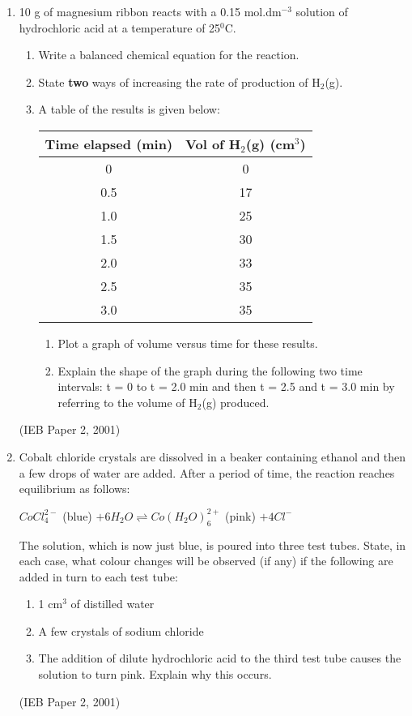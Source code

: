 {\begin{enumerate}
\item{10 g of magnesium ribbon reacts with a 0.15 mol.dm$^{-3}$ solution of hydrochloric acid at a temperature of 25$^{0}$C.
	\begin{enumerate}
	\item{Write a balanced chemical equation for the reaction.}
	\item{State \textbf{two} ways of increasing the rate of production of H$_{2}$(g).}
	\item{A table of the results is given below:}
\begin{center}
\begin{tabular}{|c|c|}\hline
\textbf{Time elapsed (min)} & \textbf{Vol of H$_{2}$(g) (cm$^{3}$)}\\\hline
0 & 0 \\\hline
0.5 & 17 \\\hline
1.0 & 25 \\\hline
1.5 & 30 \\\hline
2.0 & 33 \\\hline
2.5 & 35 \\\hline
3.0 & 35 \\\hline
\end{tabular}
\end{center}
		\begin{enumerate}
		\item{Plot a graph of volume versus time for these results.}
		\item{Explain the shape of the graph during the following two time intervals: t = 0 to t = 2.0 min and then t = 2.5 and t = 3.0 min by referring to the volume of H$_{2}$(g) produced.}
		\end{enumerate}
	\end{enumerate}
}
(IEB Paper 2, 2001)

\item{Cobalt chloride crystals are dissolved in a beaker containing ethanol and then a few drops of water are added. After a period of time, the reaction reaches equilibrium as follows:
\begin{center}
\rm${CoCl_{4}^{2-}}$ (blue) \rm${ + 6H_{2}O \rightleftharpoons Co(H_{2}O)_{6}^{2+}}$ (pink) \rm${ + 4Cl^{-}}$
\end{center}

The solution, which is now just blue, is poured into three test tubes. State, in each case, what colour changes will be observed (if any) if the following are added in turn to each test tube:

	\begin{enumerate}
	\item{1 cm$^{3}$ of distilled water}
	\item{A few crystals of sodium chloride}
	\item{The addition of dilute hydrochloric acid to the third test tube causes the solution to turn pink. Explain why this occurs.}
	\end{enumerate}
}
(IEB Paper 2, 2001)


\end{enumerate}
}


